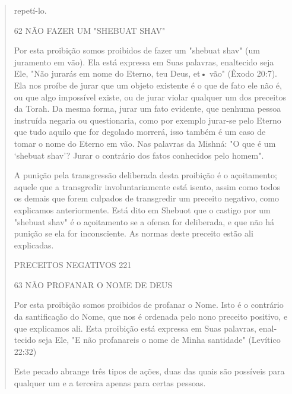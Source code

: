 \begin{quote}
repetí-lo.

62 NÃO FAZER UM "SHEBUAT SHAV"

Por esta proibição somos proibidos de fazer um "shebuat shav" (um
juramento em vão). Ela está expressa em Suas palavras, enaltecido seja
Ele, "Não jurarás em nome do Eterno, teu Deus, et• vão" (Êxodo 20:7).
Ela nos proíbe de jurar que um objeto existente é o que de fato ele não
é, ou que algo impossí­vel existe, ou de jurar violar qualquer um dos
preceitos da Torah. Da mesma forma, jurar um fato evidente, que nenhuma
pessoa instruída negaria ou ques­tionaria, como por exemplo jurar-se
pelo Eterno que tudo aquilo que for dego­lado morrerá, isso também é um
caso de tomar o nome do Eterno em vão. Nas palavras da Mishná: "O que é
um `shebuat shav'? Jurar o contrário dos fatos conhecidos pelo homem".

A punição pela transgressão deliberada desta proibição é o açoita­mento;
aquele que a transgredir involuntariamente está isento, assim como
to­dos os demais que forem culpados de transgredir um preceito negativo,
como explicamos anteriormente. Está dito em Shebuot que o castigo por um
"she­buat shav" é o açoitamento se a ofensa for deliberada, e que não há
punição se ela for inconsciente. As normas deste preceito estão ali
explicadas.

PRECEITOS NEGATIVOS 221

63 NÃO PROFANAR O NOME DE DEUS

Por esta proibição somos proibidos de profanar o Nome. Isto é o
contrário da santificação do Nome, que nos é ordenada pelo nono preceito
po­sitivo, e que explicamos ali. Esta proibição está expressa em Suas
palavras, enal­tecido seja Ele, "E não profanareis o nome de Minha
santidade" (Levítico 22:32)

Este pecado abrange três tipos de ações, duas das quais são possí­veis
para qualquer um e a terceira apenas para certas pessoas.


\end{quote}
